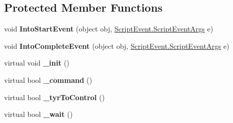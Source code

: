 \subsection*{Protected Member Functions}
\begin{DoxyCompactItemize}
\item 
\hypertarget{classlib_wather_debugger_1_1_script_1_1_debug_script_a12518436dc5a3f29a9fc7d57244eaad5}{void {\bfseries Into\+Start\+Event} (object obj, \hyperlink{classlib_wather_debugger_1_1_script_1_1_script_event_1_1_script_event_args}{Script\+Event.\+Script\+Event\+Args} e)}\label{classlib_wather_debugger_1_1_script_1_1_debug_script_a12518436dc5a3f29a9fc7d57244eaad5}

\item 
\hypertarget{classlib_wather_debugger_1_1_script_1_1_debug_script_a13d9b1c5a8b7dc8ea76402373776b413}{void {\bfseries Into\+Complete\+Event} (object obj, \hyperlink{classlib_wather_debugger_1_1_script_1_1_script_event_1_1_script_event_args}{Script\+Event.\+Script\+Event\+Args} e)}\label{classlib_wather_debugger_1_1_script_1_1_debug_script_a13d9b1c5a8b7dc8ea76402373776b413}

\item 
\hypertarget{classlib_wather_debugger_1_1_script_1_1_debug_script_a58dc7042b728de21ea8d845e6fef30a7}{virtual void {\bfseries \+\_\+init} ()}\label{classlib_wather_debugger_1_1_script_1_1_debug_script_a58dc7042b728de21ea8d845e6fef30a7}

\item 
\hypertarget{classlib_wather_debugger_1_1_script_1_1_debug_script_a1f706c3e52d8568f63b2486ca6e434c9}{virtual bool {\bfseries \+\_\+command} ()}\label{classlib_wather_debugger_1_1_script_1_1_debug_script_a1f706c3e52d8568f63b2486ca6e434c9}

\item 
\hypertarget{classlib_wather_debugger_1_1_script_1_1_debug_script_a9b46129d4857726ef42e2beefb714ece}{virtual bool {\bfseries \+\_\+tyr\+To\+Control} ()}\label{classlib_wather_debugger_1_1_script_1_1_debug_script_a9b46129d4857726ef42e2beefb714ece}

\item 
\hypertarget{classlib_wather_debugger_1_1_script_1_1_debug_script_a38eb952341f3cf0ce7f37b399d2ecf1f}{virtual bool {\bfseries \+\_\+wait} ()}\label{classlib_wather_debugger_1_1_script_1_1_debug_script_a38eb952341f3cf0ce7f37b399d2ecf1f}

\end{DoxyCompactItemize}
